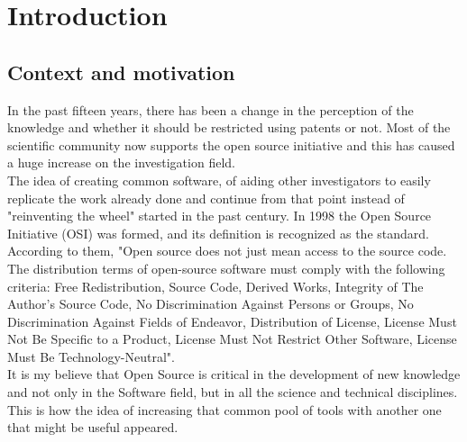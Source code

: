 \part{Introduction}


%	 
%	





\chapter{Context and motivation}
In the past fifteen years, there has been a change in the perception of the knowledge and whether it should be restricted using patents or not. Most of the scientific community now supports the open source initiative and this has caused a huge increase on the investigation field. \\



The idea of creating common software, of aiding other investigators to easily replicate the work already done and continue from that point instead of "reinventing the wheel" started in the past century. In 1998 the Open Source Initiative (OSI)\cite{osi} was formed, and its definition is recognized as the standard. According to them, "Open source does not just mean access to the source code. The distribution terms of open-source software must comply with the following criteria: Free Redistribution, Source Code, Derived Works, Integrity of The Author's Source Code, No Discrimination Against Persons or Groups, No Discrimination Against Fields of Endeavor, Distribution of License, License Must Not Be Specific to a Product, License Must Not Restrict Other Software,  License Must Be Technology-Neutral"\cite{osi_def}. 
\\

It is my believe that Open Source is critical in the development of new knowledge and not only in the Software field, but in all the science and technical disciplines. This is how the idea of increasing that common pool of tools with another one that might be useful appeared. 
\\


